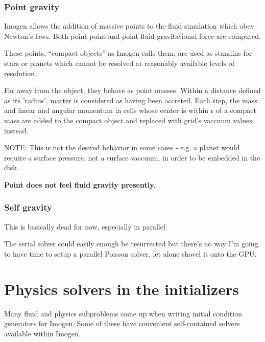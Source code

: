 \documentclass[letterpaper,12pt]{article}
\begin{document}
\subsubsection{Point gravity}

Imogen allows the addition of massive points to the fluid simulation which obey Newton's
laws. Both point-point and point-fluid gravitational force are computed.

These points, ``compact objects'' as Imogen calls them, are used as standins for stars
or planets which cannot be resolved at reasonably available levels of resolution.

Far away from the object, they behave as point masses. Within a distance defined as
its 'radius', matter is considered as having been accreted. Each step, the mass and
linear and angular momentum in cells whose center is within r of a compact mass
are added to the compact object and replaced with grid's vaccuum values instead.

NOTE: This is not the desired behavior in some cases - e.g. a planet would require a surface
pressure, not a surface vaccuum, in order to be embedded in the disk.

\textbf{Point does not feel fluid gravity presently.}

\subsubsection{Self gravity}

This is basically dead for now, especially in parallel.

The serial solver could easily enough be resurrected but there's no way I'm going
to have time to setup a parallel Poisson solver, let alone shovel it onto the GPU.

\section{Physics solvers in the initializers}

Many fluid and physics subproblems come up when writing initial condition generators
for Imogen. Some of these have convenient self-contained solvers available within
Imogen.
\end{document}
